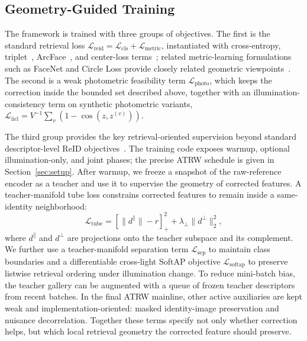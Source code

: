 \documentclass[sigconf,screen,review,anonymous]{acmart}
\begin{document}
\subsection{Geometry-Guided Training}
\label{sec:geometry}

The framework is trained with three groups of objectives.
The first is the standard retrieval loss
$\mathcal{L}_{\text{reid}} = \mathcal{L}_{\text{cls}} +
\mathcal{L}_{\text{metric}}$,
instantiated with cross-entropy, triplet~\cite{hermans2017triplet},
ArcFace~\cite{deng2019arcface}, and center-loss terms~\cite{wen2016discriminative};
related metric-learning formulations such as FaceNet and Circle Loss provide
closely related geometric viewpoints~\cite{schroff2015facenet,sun2020circle}.
The second is a weak photometric feasibility term
$\mathcal{L}_{\text{photo}}$, which keeps the correction inside the bounded
set described above, together with an illumination-consistency term on
synthetic photometric variants,
$\mathcal{L}_{\text{iicl}} = V^{-1}\sum_{v}(1 - \cos(z, z^{(v)}))$.

The third group provides the key retrieval-oriented supervision beyond
standard descriptor-level ReID objectives~\cite{hermans2017triplet,deng2019arcface,dou2023isr,zhu2024seas}.
The training code exposes warmup, optional illumination-only, and joint
phases; the precise ATRW schedule is given in Section~\ref{sec:setup}.
After warmup, we freeze a snapshot of the raw-reference encoder as a teacher
and use it to supervise the geometry of corrected features.
A teacher-manifold tube loss constrains corrected features to remain inside a
same-identity neighborhood:
\begin{equation}
  \mathcal{L}_{\text{tube}}
  =
  [\|d^{\parallel}\| - r]_{+}^{2}
  +
  \lambda_{\perp}\|d^{\perp}\|_{2}^{2},
\end{equation}
where $d^{\parallel}$ and $d^{\perp}$ are projections onto the teacher
subspace and its complement.
We further use a teacher-manifold separation term
$\mathcal{L}_{\text{sep}}$ to maintain class boundaries and a differentiable
cross-light SoftAP objective $\mathcal{L}_{\text{softap}}$ to preserve
listwise retrieval ordering under illumination change.
To reduce mini-batch bias, the teacher gallery can be augmented with a queue of
frozen teacher descriptors from recent batches.
In the final ATRW mainline, other active auxiliaries are kept weak and
implementation-oriented: masked identity-image preservation and nuisance
decorrelation.
Together these terms specify not only whether correction helps, but which local
retrieval geometry the corrected feature should preserve.
\end{document}

